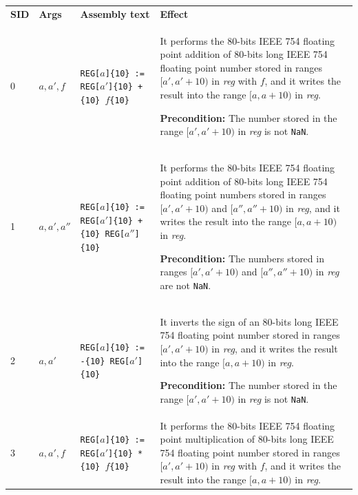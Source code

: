 \documentclass[10pt,twocolumn]{article}
\begin{document}
\begin{table}[!h]
\begin{center}
\def\arraystretch{1.5}
\begin{tabular}{lp{1.2cm}p{5.5cm}p{7.5cm}}
\textbf{SID} & \textbf{Args} & \textbf{Assembly text} & \textbf{Effect}
\\

0 & $ a,a',f $ %
& \texttt{REG[}$ a $\texttt{]\{10\} := REG[}$ a' $\texttt{]\{10\} +\{10\} }$ f
$\texttt{\{10\}} %
& It performs the $ 80 $-bits IEEE 754 floating point addition of $ 80 $-bits
long IEEE 754 floating point number stored in ranges $ [a',a'+10) $ in
\textit{reg} with $ f $, and it writes the result into the range $ [a,a+10) $ in
\textit{reg}.

\textbf{Precondition:} The number stored in the range $ [a',a'+10) $ in
\textit{reg} is not \texttt{NaN}. \\

1 & $ a,a',a'' $ %
& \texttt{REG[}$ a $\texttt{]\{10\} := REG[}$ a' $\texttt{]\{10\} +\{10\} REG[}$
a'' $\texttt{]\{10\}} %
& It performs the $ 80 $-bits IEEE 754 floating point addition of $ 80 $-bits
long IEEE 754 floating point numbers stored in ranges $ [a',a'+10) $ and $
[a'',a''+10) $ in \textit{reg}, and it writes the result into the range $
[a,a+10) $ in \textit{reg}.

\textbf{Precondition:} The numbers stored in ranges $ [a',a'+10) $ and $
[a'',a''+10) $  in \textit{reg} are not \texttt{NaN}. \\

2 & $ a,a' $ %
& \texttt{REG[}$ a $\texttt{]\{10\} := -\{10\} REG[}$ a' $\texttt{]\{10\} } %
& It inverts the sign of an $ 80 $-bits long IEEE 754 floating point number
stored in ranges $ [a',a'+10) $ in \textit{reg}, and it writes the result into
the range $ [a,a+10) $ in \textit{reg}.

\textbf{Precondition:} The number stored in the range $ [a',a'+10) $ in
\textit{reg} is not \texttt{NaN}. \\

3 & $ a,a',f $ %
& \texttt{REG[}$ a $\texttt{]\{10\} := REG[}$ a' $\texttt{]\{10\} *\{10\} }$ f
$\texttt{\{10\}} %
& It performs the $ 80 $-bits IEEE 754 floating point multiplication of $ 80 $-bits
long IEEE 754 floating point number stored in ranges $ [a',a'+10) $ in
\textit{reg} with $ f $, and it writes the result into the range $ [a,a+10) $ in
\textit{reg}.


\end{tabular}
\end{center}
\end{table}
\end{document}
